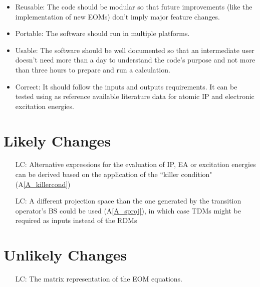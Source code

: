 \documentclass[12pt]{article}
\newcommand{\aref}[1]{A\ref{#1}}
\newcounter{lcnum} %
\begin{document}
\begin{itemize}
\item Reusable: The code should be modular so that future improvements (like 
the implementation of new EOMs) don't imply major feature changes.
\item Portable: The software should run in multiple platforms.
\item Usable: The software should be well documented so that an intermediate 
user doesn't need more than a day to understand the code's purpose and not more 
than three hours to prepare and run a calculation.
\item Correct: It should follow the inputs and outputs requirements. It can be 
tested using as reference available literature data for atomic IP and 
electronic excitation energies. 
\end{itemize}

\section{Likely Changes}    

\noindent \begin{itemize}

\item[LC\refstepcounter{lcnum}\thelcnum\label{LC_newEOMs}:] Alternative 
expressions for the evaluation of IP, EA or excitation energies can be derived 
based on the application of the ``killer condition" (\aref{A_killercond})

\item[LC\refstepcounter{lcnum}\thelcnum\label{LC_asymmetricEOMs}:] A different 
projection space than the one generated by the transition operator's BS could 
be used (\aref{A_sproj}), in which case TDMs might be required as inputs 
instead of the RDMs 



\end{itemize}

\section{Unlikely Changes}    

\noindent \begin{itemize}
	
	\item[LC\refstepcounter{lcnum}\thelcnum\label{LC_matrix}:] The matrix 
	representation of the EOM equations.
	
\end{itemize}
\end{document}

